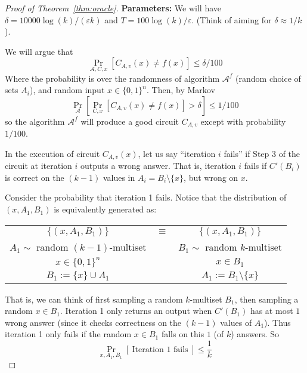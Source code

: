 \documentclass[]{article}
\newcommand{\1}{\mathbb{1}}
\renewcommand{\epsilon}{\varepsilon}
\newcommand{\A}{\mathcal{A}}
\begin{document}
\begin{proof}[Proof of Theorem~\ref{thm:oracle}]


{\bf Parameters:} We will have
$\delta = 10000\log(k)/(\epsilon k)$
and
$T = 100 \log(k)/ \epsilon$.
(Think of aiming for $\delta \approx 1/k$).

We will argue that
\begin{equation}
    \label{eqn:main}
    \Pr_{\A, C, x}[C_{A, v}(x) \neq f(x)] \leq \delta / 100
\end{equation}
Where the probability is over the randomness of algorithm $\A^f$ (random choice of
sets $A_i$), and random input $x \in \{0, 1\}^n$.
Then, by Markov
$$\Pr_{\A}\left[ \Pr_{C, x}[C_{A, v}(x) \neq f(x)] > \delta \right] \leq 1/100$$
so the algorithm $\A^f$ will produce a good circuit $C_{A, v}$ except with probability $1/100$.

In the execution of circuit $C_{A, v}(x)$, let us say
``iteration $i$ fails'' if Step 3 of the circuit at iteration $i$ outputs a wrong answer.
That is, iteration $i$ fails if $C'(B_i)$ is correct on the $(k-1)$ values in
$A_i = B_i \setminus \{x\}$, but wrong on $x$.

Consider the probability that iteration 1 fails.
Notice that the distribution of $(x, A_1, B_1)$ is equivalently generated as:

\begin{tabular}{ccc}
    $\{(x, A_1, B_1)\}$  & $\equiv$ & $\{(x, A_1, B_1)\}$  \\
    $A_1 \sim$ random $(k-1)$-multiset & & $B_1 \sim$ random $k$-multiset \\
     $x \in \{0, 1\}^n$ & & $x \in B_1$\\
    $B_1 := \{x\} \cup A_1$ & & $A_1 := B_1 \setminus \{x\}$
\end{tabular}

That is, we can think of first sampling a random $k$-multiset $B_1$,
then sampling a random $x \in B_1$.
Iteration 1 only returns an output when $C'(B_1)$
has at most $1$ wrong answer
(since it checks correctness on the $(k-1)$ values of $A_1$).
Thus iteration 1 only fails if the random $x \in B_1$ falls on this $1$ (of $k$)
answers.
So
\begin{equation}
    \Pr_{x, A_1, B_1}[~\text{Iteration 1 fails}~] \leq \frac{1}{k}
\end{equation}


\end{proof}
\end{document}
